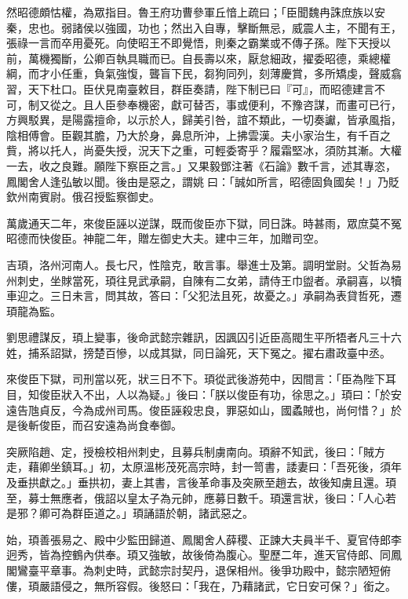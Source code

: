 \begin{pinyinscope}
 然昭德頗怙權，為眾指目。魯王府功曹參軍丘愔上疏曰；「臣聞魏冉誅庶族以安秦，忠也。弱諸侯以強國，功也；然出入自專，擊斷無忌，威震人主，不聞有王，張祿一言而卒用憂死。向使昭王不即覺悟，則秦之霸業或不傳子孫。陛下天授以前，萬機獨斷，公卿百執具職而已。自長壽以來，厭怠細政，擢委昭德，乘總權綱，而才小任重，負氣強愎，聾盲下民，芻狗同列，刻薄慶賞，多所矯虔，聲威翕習，天下杜口。臣伏見南臺敕目，群臣奏請，陛下制已曰『可』，而昭德建言不可，制又從之。且人臣參奉機密，獻可替否，事或便利，不豫咨謀，而畫可已行，方興駁異，是陽露擅命，以示於人，歸美引咎，誼不類此，一切奏讞，皆承風指，陰相傅會。臣觀其膽，乃大於身，鼻息所沖，上拂雲漢。夫小家治生，有千百之貲，將以托人，尚憂失授，況天下之重，可輕委寄乎？履霜堅冰，須防其漸。大權一去，收之良難。願陛下察臣之言。」又果毅鄧注著《石論》數千言，述其專恣，鳳閣舍人逢弘敏以聞。後由是惡之，謂姚曰：「誠如所言，昭德固負國矣！」乃貶欽州南賓尉。俄召授監察御史。



 萬歲通天二年，來俊臣誣以逆謀，既而俊臣亦下獄，同日誅。時甚雨，眾庶莫不冤昭德而快俊臣。神龍二年，贈左御史大夫。建中三年，加贈司空。



 吉頊，洛州河南人。長七尺，性陰克，敢言事。舉進士及第。調明堂尉。父哲為易州刺史，坐賕當死，頊往見武承嗣，自陳有二女弟，請侍王巾盥者。承嗣喜，以犢車迎之。三日未言，問其故，答曰：「父犯法且死，故憂之。」承嗣為表貸哲死，遷頊龍為監。



 劉思禮謀反，頊上變事，後命武懿宗雜訊，因諷囚引近臣高閥生平所牾者凡三十六姓，捕系詔獄，搒楚百慘，以成其獄，同日論死，天下冤之。擢右肅政臺中丞。



 來俊臣下獄，司刑當以死，狀三日不下。頊從武後游苑中，因間言：「臣為陛下耳目，知俊臣狀入不出，人以為疑。」後曰：「朕以俊臣有功，徐思之。」頊曰：「於安遠告虺貞反，今為成州司馬。俊臣誣殺忠良，罪惡如山，國蟊賊也，尚何惜？」於是後斬俊臣，而召安遠為尚食奉御。



 突厥陷趙、定，授檢校相州刺史，且募兵制虜南向。頊辭不知武，後曰：「賊方走，藉卿坐鎮耳。」初，太原溫彬茂死高宗時，封一笥書，諉妻曰：「吾死後，須年及垂拱獻之。」垂拱初，妻上其書，言後革命事及突厥至趙去，故後知虜且還。頊至，募士無應者，俄詔以皇太子為元帥，應募日數千。頊還言狀，後曰：「人心若是邪？卿可為群臣道之。」頊誦語於朝，諸武惡之。



 始，頊善張易之、殿中少監田歸道、鳳閣舍人薛稷、正諫大夫員半千、夏官侍郎李迥秀，皆為控鶴內供奉。頊又強敏，故後倚為腹心。聖歷二年，進天官侍郎、同鳳閣鸞臺平章事。為刺史時，武懿宗討契丹，退保相州。後爭功殿中，懿宗陋短俯僂，頊嚴語侵之，無所容假。後怒曰：「我在，乃藉諸武，它日安可保？」銜之。




\end{pinyinscope}
